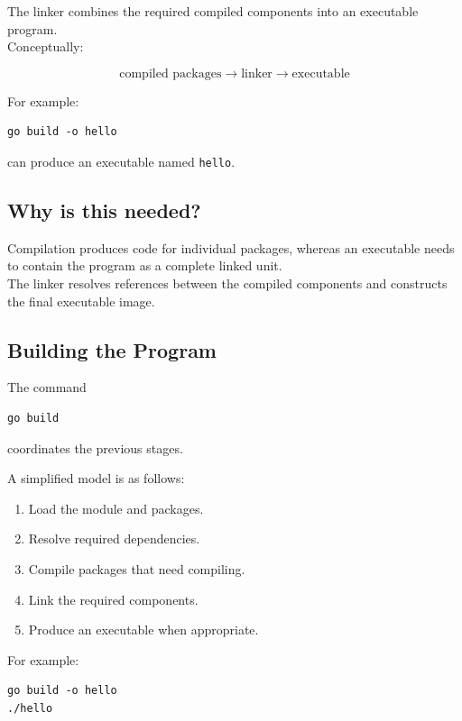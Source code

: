 The linker combines the required compiled components into an executable
program.\\

Conceptually:

\[
\text{compiled packages}
\longrightarrow
\text{linker}
\longrightarrow
\text{executable}
\]

For example:

\begin{lstlisting}
go build -o hello
\end{lstlisting}

can produce an executable named \texttt{hello}.

\subsection*{Why is this needed?}

Compilation produces code for individual packages, whereas an
executable needs to contain the program as a complete linked unit.\\

The linker resolves references between the compiled components and
constructs the final executable image.

\subsection{Building the Program}

The command

\begin{lstlisting}
go build
\end{lstlisting}

coordinates the previous stages.

A simplified model is as follows:

\begin{enumerate}[label=\arabic*.]
    \item Load the module and packages.
    \item Resolve required dependencies.
    \item Compile packages that need compiling.
    \item Link the required components.
    \item Produce an executable when appropriate.
\end{enumerate}

For example:

\begin{lstlisting}
go build -o hello
./hello
\end{lstlisting}

